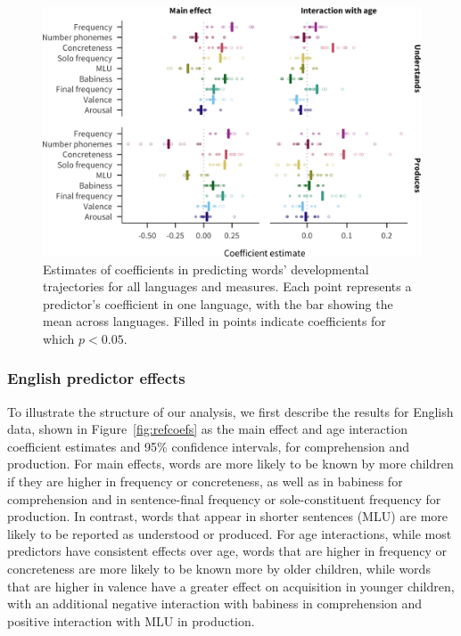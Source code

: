 \documentclass[manuscript]{stjour}
\begin{document}
\begin{figure}

{\centering \includegraphics[width=\textwidth]{langcoefs-1}

}

\caption{Estimates of coefficients in predicting words' developmental trajectories for all languages and measures. Each point represents a predictor's coefficient in one language, with the bar showing the mean across languages. Filled in points indicate coefficients for which $p < 0.05$.}\label{fig:langcoefs}
\end{figure}

\subsubsection{English predictor effects}

To illustrate the structure of our analysis, we first describe the
results for English data, shown in Figure~\ref{fig:refcoefs} as the main
effect and age interaction coefficient estimates and 95\% confidence
intervals, for comprehension and production. For main effects, words are
more likely to be known by more children if they are higher in frequency
or concreteness, as well as in babiness for comprehension and in
sentence-final frequency or sole-constituent frequency for production.
In contrast, words that appear in shorter sentences (MLU) are more
likely to be reported as understood or produced. For age interactions,
while most predictors have consistent effects over age, words that are
higher in frequency or concreteness are more likely to be known more by
older children, while words that are higher in valence have a greater
effect on acquisition in younger children, with an additional negative
interaction with babiness in comprehension and positive interaction with
MLU in production.
\end{document}
